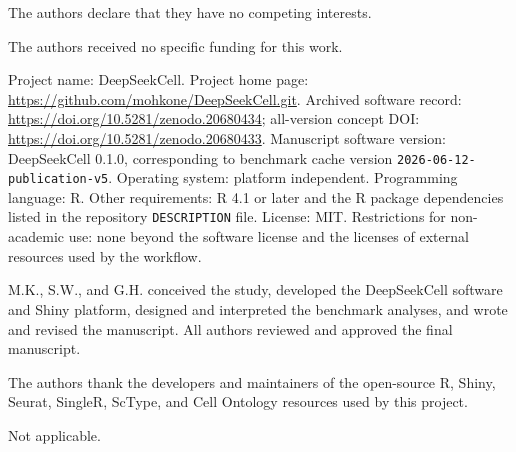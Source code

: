\documentclass[referee,lineno,pdflatex]{sn-jnl}
\begin{document}
The authors declare that they have no competing interests.

The authors received no specific funding for this work.

Project name: DeepSeekCell. Project home page: \url{https://github.com/mohkone/DeepSeekCell.git}. Archived software record: \url{https://doi.org/10.5281/zenodo.20680434}; all-version concept DOI: \url{https://doi.org/10.5281/zenodo.20680433}. Manuscript software version: DeepSeekCell 0.1.0, corresponding to benchmark cache version \texttt{2026-06-12-publication-v5}. Operating system: platform independent. Programming language: R. Other requirements: R 4.1 or later and the R package dependencies listed in the repository \texttt{DESCRIPTION} file. License: MIT. Restrictions for non-academic use: none beyond the software license and the licenses of external resources used by the workflow.

M.K., S.W., and G.H. conceived the study, developed the DeepSeekCell software and Shiny platform, designed and interpreted the benchmark analyses, and wrote and revised the manuscript. All authors reviewed and approved the final manuscript.

The authors thank the developers and maintainers of the open-source R, Shiny, Seurat, SingleR, ScType, and Cell Ontology resources used by this project.

Not applicable.



\end{document}
